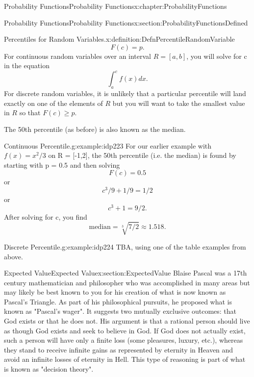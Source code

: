 \documentclass[oneside,10pt,]{book}
\numberwithin{equation}{section}
\begin{document}
\begin{chapterptx}{Probability Functions}{}{Probability Functions}{}{}{x:chapter:ProbabilityFunctions}
\begin{sectionptx}{Probability Functions}{}{Probability Functions}{}{}{x:section:ProbabilityFunctionsDefined}
\begin{definition}{Percentiles for Random Variables.}{x:definition:DefnPercentileRandomVariable}
\begin{equation*}
F(c) = p.
\end{equation*}
For continuous random variables over an interval \(R = [a,b]\), you will solve for c in the equation%
\begin{equation*}
\int_a^c f(x) dx.
\end{equation*}
For discrete random variables, it is unlikely that a particular percentile will land exactly on one of the elements of \(R\) but you will want to take the smallest value in \(R\) so that \(F(c) \ge p\).%
\par
The 50th percentile (as before) is also known as the median.%
\end{definition}
%
\par
\begin{example}{Continuous Percentile.}{g:example:idp223}%
For our earlier example with \(f(x) = x^2/3\) on R = [-1,2], the 50th percentile (i.e. the median) is found by starting with p = 0.5 and then solving%
\begin{equation*}
F(c) = 0.5
\end{equation*}
or%
\begin{equation*}
c^3/9 + 1/9 = 1/2
\end{equation*}
or%
\begin{equation*}
c^3 + 1 = 9/2.
\end{equation*}
After solving for c, you find%
\begin{equation*}
\text{median} = \sqrt[3]{7/2} \approx 1.518.
\end{equation*}
%
\end{example}
%
\par
\begin{example}{Discrete Percentile.}{g:example:idp224}%
TBA, using one of the table examples from above.%
\end{example}
%
\end{sectionptx}
%
%
\typeout{************************************************}
\typeout{************************************************}
%
\begin{sectionptx}{Expected Value}{}{Expected Value}{}{}{x:section:ExpectedValue}
Blaise Pascal was a 	17th century mathematician and philosopher who was accomplished in many areas but may likely be best known to you for his creation of what is now known as Pascal's Triangle. As part of his philosophical pursuits, he proposed what is known as "Pascal's wager". It suggests two  mutually exclusive outcomes: that God exists or that he does not. His argument is that a rational person should live as though God exists and seek to believe in God. If God does not actually exist, such a person will have only a finite loss (some pleasures, luxury, etc.), whereas they stand to receive infinite gains as represented by eternity in Heaven and avoid an infinite losses of eternity in Hell. This type of reasoning is part of what is known as "decision theory".%

\end{sectionptx}
\end{chapterptx}
\end{document}
